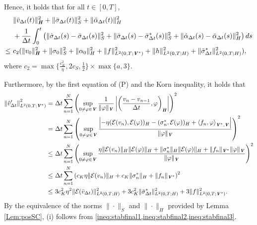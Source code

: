 \documentclass[11pt, a4paper]{article}
\newcommand{\dt}{{\Delta t}}
\newcommand{\E}{{\mathcal{E}}}
\newcommand{\bm}[1]{\textbf{\textit{#1}}}%
\newcommand{\Hv}{{\bm{H}}}
\newcommand{\Vv}{{\bm{V}}}
\newcommand{\Hs}{{H}}
\newcommand{\blaket}[2]{ \left\langle {#1},{#2}\right\rangle_{\Vv^*,\Vv} }
\newcommand{\inner}[3]{ \left( {#1},{#2}\right)_{#3} }
\newcommand{\sigmas}[1]{{\sigma_{#1}^*}}
\begin{document}
Hence, it holds that for all $t\in[0,T]$,
\begin{align}\label{ineq:stabfinal2}\begin{aligned}
    &\|\bar{v}_\dt(t)\|_\Hv^2 
    + \|\bar{\sigma}_\dt(t)\|_S^2
    + \|\bar{\alpha}_\dt(t)\|_\Hs^2\\
    &+ \frac{1}{\dt}\int_0^t\left(\|\hat{\sigma}_\dt(s)-\bar{\sigma}_\dt(s)\|_S^2
    + \|\bar{\sigma}_\dt(s)-\bar{\sigma}^*_\dt(s)\|_S^2
    + \|\hat{\alpha}_\dt(s)-\bar{\alpha}_\dt(s)\|_\Hs^2 \right)ds\\
    \le~& c_2(\|v_0\|_\Hv^2 + \|\sigma_0\|_S^2 + \|\alpha_0\|_\Hs^2 + \|f\|_{L^2(0,T;\Vv^*)}^2 + \|h\|_{L^2(0,T;\Hs)}^2+ \|\bar{\sigma}^*_\dt\|^2_{L^2(0,T;\Hs)}),
\end{aligned}\end{align}
where $c_2=\max\{\frac{c_K^2}{\eta},2c_S,\frac{1}{2}\}\times\max\{a,3\}$. 

Furthermore, by the first equation of (P) and the Korn inequality, it holds that 
\begin{align}\label{ineq:stabfinal3}\begin{aligned}
    \left\|\hat{v}'_\dt\right\|_{L^2(0,T;\Vv^*)}^2
    =~& \dt\sum_{n=1}^N \left(\sup_{0 \ne \varphi \in \Vv}\frac{1}{\|\varphi\|_\Vv}\left|\inner{\frac{v_n-v_{n-1}}{\dt}}{\varphi}{\Hv}\right|\right)^2 \\
    =~& \dt\sum_{n=1}^N \left(\sup_{0 \ne \varphi \in \Vv}\frac{\left|
        - \eta (\E(v_n),\E(\varphi))_\Hs - (\sigmas{n},\E(\varphi))_\Hs 
        + \blaket{f_n}{\varphi}\right|}{\|\varphi\|_\Vv}\right)^2\\
    \le~& \dt\sum_{n=1}^N \left(\sup_{0 \ne \varphi \in \Vv}\frac{
        \eta\|\E(v_n)\|_\Hs\|\E(\varphi)\|_\Hs 
    + \|\sigmas{n}\|_\Hs\|\E(\varphi)\|_\Hs 
    + \|f_n\|_{\Vv^*}\|\varphi\|_\Vv}{\|\varphi\|_\Vv}\right)^2\\
    \le~& \dt\sum_{n=1}^N \left(c_K\eta\|\E(v_n)\|_\Hs + c_K\|\sigmas{n}\|_\Hs + \|f_n\|_{\Vv^*}\right)^2\\
    \le~& 3c_K^2\eta^2\|\E(\bar{v}_\dt)\|_{L^2(0,T;\Hs)}^2 + 3c_K^2\|\bar{\sigma}_\dt^*\|_{L^2(0,T;\Hs)}^2 + 3\|f\|_{L^2(0,T;\Vv^*)}^2.
\end{aligned}\end{align}
By the equivalence of the norms $\|\cdot\|_S$ and $\|\cdot\|_\Hs$ provided by Lemma \ref{Lem:posSC}, (i) follows from \cref{ineq:stabfinal1,ineq:stabfinal2,ineq:stabfinal3}.
\end{document}
